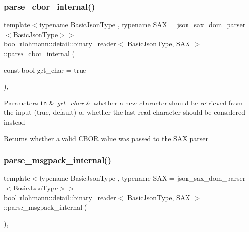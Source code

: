\subsubsection{\texorpdfstring{parse\+\_\+cbor\+\_\+internal()}{parse\_cbor\_internal()}}
{\footnotesize\ttfamily template$<$typename Basic\+Json\+Type , typename S\+AX  = json\+\_\+sax\+\_\+dom\+\_\+parser$<$\+Basic\+Json\+Type$>$$>$ \\
bool \hyperlink{classnlohmann_1_1detail_1_1binary__reader}{nlohmann\+::detail\+::binary\+\_\+reader}$<$ Basic\+Json\+Type, S\+AX $>$\+::parse\+\_\+cbor\+\_\+internal (\begin{DoxyParamCaption}\item[{const bool}]{get\+\_\+char = {\ttfamily true} }\end{DoxyParamCaption})\hspace{0.3cm}{\ttfamily [inline]}, {\ttfamily [private]}}


\begin{DoxyParams}[1]{Parameters}
\mbox{\tt in}  & {\em get\+\_\+char} & whether a new character should be retrieved from the input (true, default) or whether the last read character should be considered instead\\
\hline
\end{DoxyParams}
\begin{DoxyReturn}{Returns}
whether a valid C\+B\+OR value was passed to the S\+AX parser 
\end{DoxyReturn}
\mbox{\label{classnlohmann_1_1detail_1_1binary__reader_a81611d8a5faec1348d31f7e98fcd05ef}} 
\subsubsection{\texorpdfstring{parse\+\_\+msgpack\+\_\+internal()}{parse\_msgpack\_internal()}}
{\footnotesize\ttfamily template$<$typename Basic\+Json\+Type , typename S\+AX  = json\+\_\+sax\+\_\+dom\+\_\+parser$<$\+Basic\+Json\+Type$>$$>$ \\
bool \hyperlink{classnlohmann_1_1detail_1_1binary__reader}{nlohmann\+::detail\+::binary\+\_\+reader}$<$ Basic\+Json\+Type, S\+AX $>$\+::parse\+\_\+msgpack\+\_\+internal (\begin{DoxyParamCaption}{ }\end{DoxyParamCaption})\hspace{0.3cm}{\ttfamily [inline]}, {\ttfamily [private]}}

